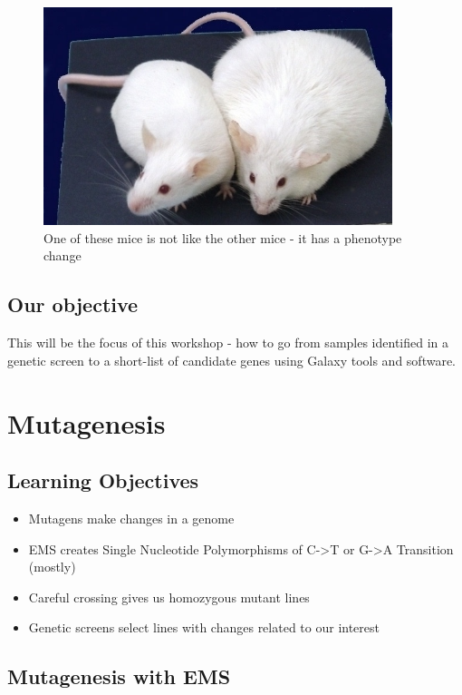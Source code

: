 \documentclass[12pt,]{book}
\providecommand{\tightlist}{%
  \setlength{\itemsep}{0pt}\setlength{\parskip}{0pt}}
\begin{document}
\begin{figure}
\includegraphics[width=4.01in]{assets/obese-mouse} \caption{One of these mice is not like the other mice - it has a phenotype change}\label{fig:mice}
\end{figure}

\section*{Our objective}\label{our-objective}

This will be the focus of this workshop - how to go from samples
identified in a genetic screen to a short-list of candidate genes using
Galaxy tools and software.

\chapter{Mutagenesis}\label{mutagenesis}

\section{Learning Objectives}\label{learning-objectives}

\begin{itemize}
\tightlist
\item
  Mutagens make changes in a genome
\item
  EMS creates Single Nucleotide Polymorphisms of C-\textgreater{}T or
  G-\textgreater{}A Transition (mostly)
\item
  Careful crossing gives us homozygous mutant lines
\item
  Genetic screens select lines with changes related to our interest
\end{itemize}

\section{Mutagenesis with EMS}\label{mutagenesis-with-ems}
\end{document}
